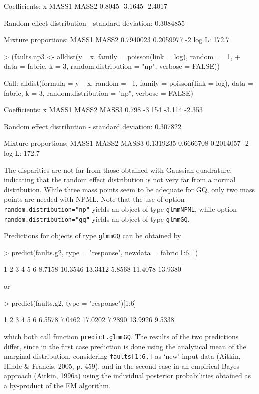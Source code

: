 \documentclass[a4paper]{article}
\begin{document}
\begin{landscape}
\begin{Schunk}
\begin{Soutput}
Coefficients:
      x    MASS1    MASS2  
 0.8045  -3.1645  -2.4017  

Random effect distribution - standard deviation:	   0.3084855 

Mixture proportions:
    MASS1      MASS2  
0.7940023  0.2059977  
-2 log L:	    172.7 
\end{Soutput}
\begin{Sinput}
> (faults.np3 <- alldist(y ~ x, family = poisson(link = log), random = ~1, 
+     data = fabric, k = 3, random.distribution = "np", verbose = FALSE))
\end{Sinput}
\begin{Soutput}
Call:  alldist(formula = y ~ x, random = ~1, family = poisson(link = log),      data = fabric, k = 3, random.distribution = "np", verbose = FALSE) 

Coefficients:
     x   MASS1   MASS2   MASS3  
 0.798  -3.154  -3.114  -2.353  

Random effect distribution - standard deviation:	   0.307822 

Mixture proportions:
    MASS1      MASS2      MASS3  
0.1319235  0.6666708  0.2014057  
-2 log L:	    172.7 
\end{Soutput}
\end{Schunk}
The disparities are not far from those obtained with Gaussian quadrature, indicating that the random effect distribution is 
not very far from a normal distribution.  While three mass points seem to be adequate for GQ, only two mass points are needed with NPML.
Note that the use of option {\tt random.distribution="np"} yields an object of type {\tt glmmNPML}, while  option {\tt random.distribution="gq"} yields an object of type {\tt glmmGQ}.
 
 Predictions  for objects of type {\tt glmmGQ} can
 be obtained  by 
\begin{Schunk}
\begin{Sinput}
> predict(faults.g2, type = "response", newdata = fabric[1:6, ])
\end{Sinput}
\begin{Soutput}
      1       2       3       4       5       6 
 8.7158 10.3546 13.3412  5.8568 11.4078 13.9380 
\end{Soutput}
\end{Schunk}
or
\begin{Schunk}
\begin{Sinput}
> predict(faults.g2, type = "response")[1:6]
\end{Sinput}
\begin{Soutput}
      1       2       3       4       5       6 
 6.5578  7.0462 17.0202  7.2890 13.9926  9.5338 
\end{Soutput}
\end{Schunk}
which both call function {\tt predict.glmmGQ}. The results of the two predictions differ, 
since in the first case prediction is done using the analytical mean of the marginal distribution, considering {\tt faults[1:6,]} as `new' input data (Aitkin, Hinde \& Francis,  2005, p. 459),  
and in the second case in an  empirical Bayes approach (Aitkin, 1996a) using the individual posterior probabilities 
obtained as a by-product of the EM algorithm.  
 

\end{landscape}
\end{document}
